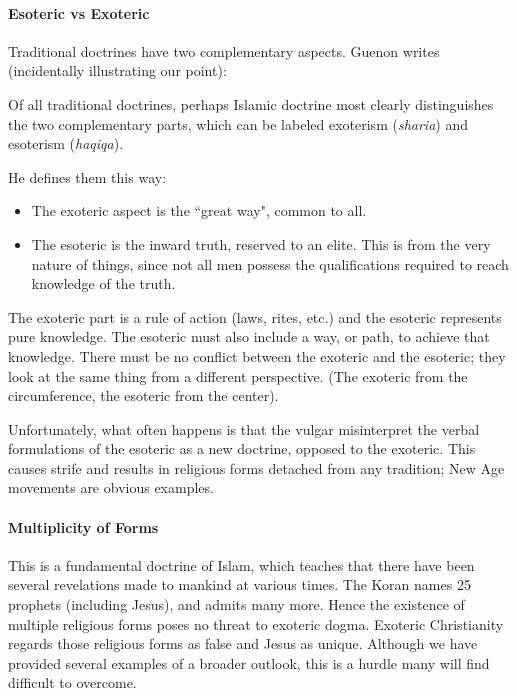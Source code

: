 \paragraph{Esoteric vs Exoteric}
Traditional doctrines have two complementary aspects. Guenon writes (incidentally illustrating our point):

\begin{quotex}
Of all traditional doctrines, perhaps Islamic doctrine most clearly distinguishes the two complementary parts, which can be labeled exoterism (\emph{sharia}) and esoterism (\emph{haqiqa}). 

\end{quotex}
He defines them this way:

\begin{itemize}
\item The exoteric aspect is the ``great way", common to all. 
\item The esoteric is the inward truth, reserved to an elite. This is from the very nature of things, since not all men possess the qualifications required to reach knowledge of the truth. 
\end{itemize}
The exoteric part is a rule of action (laws, rites, etc.) and the esoteric represents pure knowledge. The esoteric must also include a way, or path, to achieve that knowledge. There must be no conflict between the exoteric and the esoteric; they look at the same thing from a different perspective. (The exoteric from the circumference, the esoteric from the center).

Unfortunately, what often happens is that the vulgar misinterpret the verbal formulations of the esoteric as a new doctrine, opposed to the exoteric. This causes strife and results in religious forms detached from any tradition; New Age movements are obvious examples.

\paragraph{Multiplicity of Forms}
This is a fundamental doctrine of Islam, which teaches that there have been several revelations made to mankind at various times. The Koran names 25 prophets (including Jesus), and admits many more. Hence the existence of multiple religious forms poses no threat to exoteric dogma. Exoteric Christianity regards those religious forms as false and Jesus as unique. Although we have provided several examples of a broader outlook, this is a hurdle many will find difficult to overcome.

